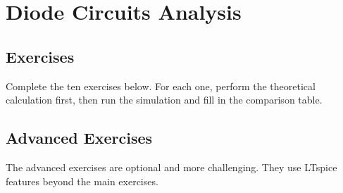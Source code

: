 \chapter{Diode Circuits Analysis}




\clearpage
\section{Exercises}
Complete the ten exercises below. For each one, perform the theoretical calculation first,
then run the simulation and fill in the comparison table.












\clearpage
\section{Advanced Exercises}
The advanced exercises are optional and more challenging. They use LTspice features beyond the main exercises.





